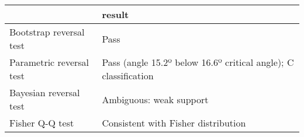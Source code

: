 \begin{tabular}{ll}
\toprule
{} &                                                           result \\
\midrule
Bootstrap reversal test  &                                                             Pass \\
Parametric reversal test &  Pass (angle 15.2º below 16.6º critical angle); C classification \\
Bayesian reversal test   &                                          Ambiguous: weak support \\
Fisher Q-Q test          &                              Consistent with Fisher distribution \\
\bottomrule
\end{tabular}

